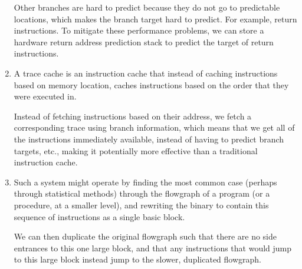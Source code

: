 \begin{enumerate}[label=(\alph*)]
         Other branches are hard to predict because they do not go to predictable locations, which makes the branch target hard to predict. For example, return instructions. To mitigate these performance problems, we can store a hardware return address prediction stack to predict the target of return instructions.

         \item
           A trace cache is an instruction cache that instead of caching instructions based on memory location, caches instructions based on the order that they were executed in.

           Instead of fetching instructions based on their address, we fetch a corresponding trace using branch information, which means that we get all of the instructions immediately available, instead of having to predict branch targets, etc., making it potentially more effective than a traditional instruction cache.

           \item
             Such a system might operate by finding the most common case (perhaps through statistical methods) through the flowgraph of a program (or a procedure, at a smaller level), and rewriting the binary to contain this sequence of instructions as a single basic block.

             We can then duplicate the original flowgraph such that there are no side entrances to this one large block, and that any instructions that would jump to this large block instead jump to the slower, duplicated flowgraph.


        
    \end{enumerate}

